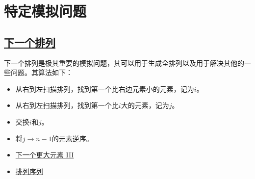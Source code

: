 \documentclass[../../main.tex]{subfiles}
\begin{document}



\section{特定模拟问题}

\subsection{\href{https://leetcode.cn/problems/next-permutation/}{下一个排列}}

下一个排列是极其重要的模拟问题，其可以用于生成全排列以及用于解决其他的一些问题。其算法如下：

\begin{itemize}
  \item 从右到左扫描排列，找到第一个比右边元素小的元素，记为$i$。
  \item 从右到左扫描排列，找到第一个比$i$大的元素，记为$j$。
  \item 交换$i$和$j$。
  \item 将$j \to n - 1$的元素逆序。
\end{itemize}



\begin{kaobox}[title=类似题目]
  \begin{itemize}
    \item \href{https://leetcode-cn.com/problems/next-greater-element-iii/}{下一个更大元素 III}
    \item \href{https://leetcode.cn/problems/permutation-sequence/}{排列序列}
  \end{itemize}
\end{kaobox}
\end{document}
